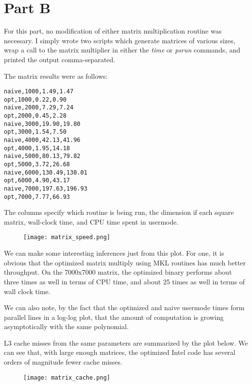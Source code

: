 \documentclass{article}
\begin{document}
\section*{Part B}
For this part, no modification of either matrix multiplication routine was
necessary. I simply wrote two scripts which generate matrices of various
sizes, wrap a call to the matrix multiplier in either the \emph{time} or
\emph{psrun} commands, and printed the output comma-separated.

The matrix results were as follows:

\begin{verbatim}
naive,1000,1.49,1.47
opt,1000,0.22,0.90
naive,2000,7.29,7.24
opt,2000,0.45,2.28
naive,3000,19.90,19.80
opt,3000,1.54,7.50
naive,4000,42.13,41.96
opt,4000,1.95,14.18
naive,5000,80.13,79.82
opt,5000,3.72,26.68
naive,6000,130.49,130.01
opt,6000,4.90,43.17
naive,7000,197.63,196.93
opt,7000,7.77,66.93
\end{verbatim}

The columns specify which routine is being run, the dimension if each square
matrix, wall-clock time, and CPU time spent in usermode.

\begin{figure}[h!]
\texttt{[image: matrix\_speed.png]}
\end{figure}

We can make some interesting inferences just from this plot. For one, it is
obvious that the optimized matrix multiply using MKL routines has much better
throughput. On the 7000x7000 matrix, the optimized binary performs about three
times as well in terms of CPU time, and about 25 times as well in terms of
wall clock time.

We can also note, by the fact that the optimized and naive usermode times form
parallel lines in a log-log plot, that the amount of computation is growing
asymptotically with the same polynomial.

L3 cache misses from the same parameters are summarized by the plot below.
We can see that, with large enough matrices, the optimized Intel code has
several orders of magnitude fewer cache misses.

\begin{figure}[h!]
\texttt{[image: matrix\_cache.png]}
\end{figure}
\end{document}
